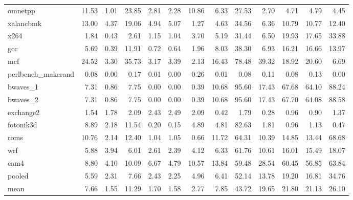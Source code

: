 \documentclass[10pt,a4paper]{article}
\begin{document}
{\begin{longtable}{@{}lrrrrrrrrrrrr@{}}
omnetpp & 11.53 & 1.01 & 23.85 & 2.81 & 2.28 & 10.86 & 6.33 & 27.53 & 2.70 & 4.71 & 4.79 & 4.45 \\
xalancbmk & 13.00 & 4.37 & 19.06 & 4.94 & 5.07 & 1.27 & 4.63 & 34.56 & 6.36 & 10.79 & 10.77 & 12.40 \\
x264 & 1.84 & 0.43 & 2.61 & 1.15 & 1.04 & 3.70 & 5.19 & 31.44 & 6.50 & 19.93 & 17.65 & 33.88 \\
gcc & 5.69 & 0.39 & 11.91 & 0.72 & 0.64 & 1.96 & 8.03 & 38.30 & 6.93 & 16.21 & 16.66 & 13.97 \\
mcf & 24.52 & 3.30 & 35.73 & 3.17 & 3.39 & 2.13 & 16.43 & 78.48 & 39.32 & 18.92 & 20.60 & 6.69 \\
perlbench\_makerand & 0.08 & 0.00 & 0.17 & 0.01 & 0.00 & 0.26 & 0.01 & 0.08 & 0.11 & 0.08 & 0.13 & 0.00 \\
bwaves\_1 & 7.31 & 0.86 & 7.75 & 0.00 & 0.00 & 0.39 & 10.68 & 95.60 & 17.43 & 67.68 & 64.10 & 88.24 \\
bwaves\_2 & 7.31 & 0.86 & 7.75 & 0.00 & 0.00 & 0.39 & 10.68 & 95.60 & 17.43 & 67.70 & 64.08 & 88.58 \\
exchange2 & 1.54 & 1.78 & 2.09 & 2.43 & 2.49 & 2.09 & 0.42 & 1.79 & 0.28 & 0.96 & 0.90 & 1.37 \\
fotonik3d & 8.89 & 2.18 & 11.54 & 0.20 & 0.15 & 4.89 & 4.81 & 82.63 & 1.81 & 0.96 & 1.13 & 0.47 \\
roms & 10.76 & 2.14 & 12.40 & 1.04 & 1.05 & 0.66 & 11.72 & 64.31 & 10.39 & 14.85 & 13.44 & 68.68 \\
wrf & 5.88 & 3.94 & 6.01 & 2.61 & 2.39 & 4.12 & 6.33 & 61.76 & 10.61 & 16.01 & 15.49 & 18.07 \\
cam4 & 8.80 & 4.10 & 10.09 & 6.67 & 4.79 & 10.57 & 13.84 & 59.48 & 28.54 & 60.45 & 56.85 & 63.84 \\
\midrule
pooled & 5.59 & 2.31 & 7.66 & 2.43 & 2.25 & 4.96 & 6.41 & 52.14 & 13.78 & 19.20 & 16.81 & 34.76 \\
mean & 7.66 & 1.55 & 11.29 & 1.70 & 1.58 & 2.77 & 7.85 & 43.72 & 19.65 & 21.80 & 21.13 & 26.10 \\
\end{longtable}
}
\end{document}
